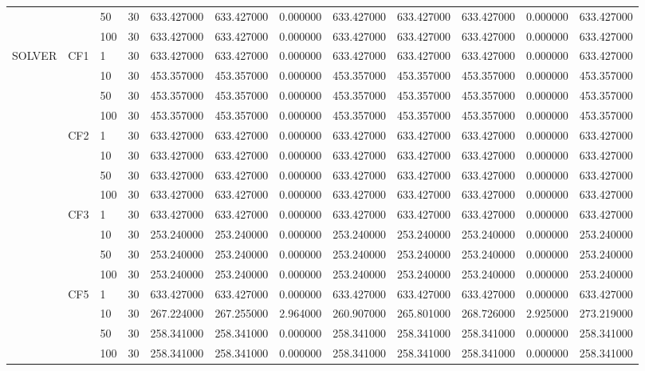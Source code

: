 \begin{tabular}{lllrrrrrrrrr}
 &  & 50 & 30 & 633.427000 & 633.427000 & 0.000000 & 633.427000 & 633.427000 & 633.427000 & 0.000000 & 633.427000 \\
 &  & 100 & 30 & 633.427000 & 633.427000 & 0.000000 & 633.427000 & 633.427000 & 633.427000 & 0.000000 & 633.427000 \\
\cline{1-12} \cline{2-12}
\multirow[t]{16}{*}{SOLVER} & \multirow[t]{4}{*}{CF1} & 1 & 30 & 633.427000 & 633.427000 & 0.000000 & 633.427000 & 633.427000 & 633.427000 & 0.000000 & 633.427000 \\
 &  & 10 & 30 & 453.357000 & 453.357000 & 0.000000 & 453.357000 & 453.357000 & 453.357000 & 0.000000 & 453.357000 \\
 &  & 50 & 30 & 453.357000 & 453.357000 & 0.000000 & 453.357000 & 453.357000 & 453.357000 & 0.000000 & 453.357000 \\
 &  & 100 & 30 & 453.357000 & 453.357000 & 0.000000 & 453.357000 & 453.357000 & 453.357000 & 0.000000 & 453.357000 \\
\cline{2-12}
 & \multirow[t]{4}{*}{CF2} & 1 & 30 & 633.427000 & 633.427000 & 0.000000 & 633.427000 & 633.427000 & 633.427000 & 0.000000 & 633.427000 \\
 &  & 10 & 30 & 633.427000 & 633.427000 & 0.000000 & 633.427000 & 633.427000 & 633.427000 & 0.000000 & 633.427000 \\
 &  & 50 & 30 & 633.427000 & 633.427000 & 0.000000 & 633.427000 & 633.427000 & 633.427000 & 0.000000 & 633.427000 \\
 &  & 100 & 30 & 633.427000 & 633.427000 & 0.000000 & 633.427000 & 633.427000 & 633.427000 & 0.000000 & 633.427000 \\
\cline{2-12}
 & \multirow[t]{4}{*}{CF3} & 1 & 30 & 633.427000 & 633.427000 & 0.000000 & 633.427000 & 633.427000 & 633.427000 & 0.000000 & 633.427000 \\
 &  & 10 & 30 & 253.240000 & 253.240000 & 0.000000 & 253.240000 & 253.240000 & 253.240000 & 0.000000 & 253.240000 \\
 &  & 50 & 30 & 253.240000 & 253.240000 & 0.000000 & 253.240000 & 253.240000 & 253.240000 & 0.000000 & 253.240000 \\
 &  & 100 & 30 & 253.240000 & 253.240000 & 0.000000 & 253.240000 & 253.240000 & 253.240000 & 0.000000 & 253.240000 \\
\cline{2-12}
 & \multirow[t]{4}{*}{CF5} & 1 & 30 & 633.427000 & 633.427000 & 0.000000 & 633.427000 & 633.427000 & 633.427000 & 0.000000 & 633.427000 \\
 &  & 10 & 30 & 267.224000 & 267.255000 & 2.964000 & 260.907000 & 265.801000 & 268.726000 & 2.925000 & 273.219000 \\
 &  & 50 & 30 & 258.341000 & 258.341000 & 0.000000 & 258.341000 & 258.341000 & 258.341000 & 0.000000 & 258.341000 \\
 &  & 100 & 30 & 258.341000 & 258.341000 & 0.000000 & 258.341000 & 258.341000 & 258.341000 & 0.000000 & 258.341000 \\
\cline{1-12} \cline{2-12}
\bottomrule
\end{tabular}

